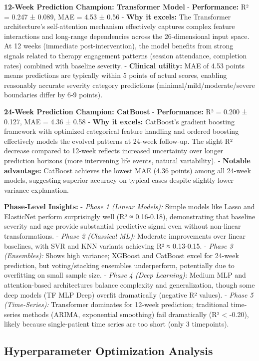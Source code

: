 \documentclass[conference]{IEEEtran}
\begin{document}
\textbf{12-Week Prediction Champion: Transformer Model}
- \textbf{Performance:} R² = 0.247 ± 0.089, MAE = 4.53 ± 0.56
- \textbf{Why it excels:} The Transformer architecture's self-attention mechanism effectively captures complex feature interactions and long-range dependencies across the 26-dimensional input space. At 12 weeks (immediate post-intervention), the model benefits from strong signals related to therapy engagement patterns (session attendance, completion rates) combined with baseline severity.
- \textbf{Clinical utility:} MAE of 4.53 points means predictions are typically within 5 points of actual scores, enabling reasonably accurate severity category predictions (minimal/mild/moderate/severe boundaries differ by 6-9 points).

\textbf{24-Week Prediction Champion: CatBoost}
- \textbf{Performance:} R² = 0.200 ± 0.127, MAE = 4.36 ± 0.58
- \textbf{Why it excels:} CatBoost's gradient boosting framework with optimized categorical feature handling and ordered boosting effectively models the evolved patterns at 24-week follow-up. The slight R² decrease compared to 12-week reflects increased uncertainty over longer prediction horizons (more intervening life events, natural variability).
- \textbf{Notable advantage:} CatBoost achieves the lowest MAE (4.36 points) among all 24-week models, suggesting superior accuracy on typical cases despite slightly lower variance explanation.

\textbf{Phase-Level Insights:}
- \textit{Phase 1 (Linear Models):} Simple models like Lasso and ElasticNet perform surprisingly well (R² ≈ 0.16-0.18), demonstrating that baseline severity and age provide substantial predictive signal even without non-linear transformations.
- \textit{Phase 2 (Classical ML):} Moderate improvements over linear baselines, with SVR and KNN variants achieving R² ≈ 0.13-0.15.
- \textit{Phase 3 (Ensembles):} Shows high variance; XGBoost and CatBoost excel for 24-week prediction, but voting/stacking ensembles underperform, potentially due to overfitting on small sample size.
- \textit{Phase 4 (Deep Learning):} Medium MLP and attention-based architectures balance complexity and generalization, though some deep models (TF MLP Deep) overfit dramatically (negative R² values).
- \textit{Phase 5 (Time-Series):} Transformer dominates for 12-week prediction; traditional time-series methods (ARIMA, exponential smoothing) fail dramatically (R² < -0.20), likely because single-patient time series are too short (only 3 timepoints).

\subsection{Hyperparameter Optimization Analysis}
\end{document}
